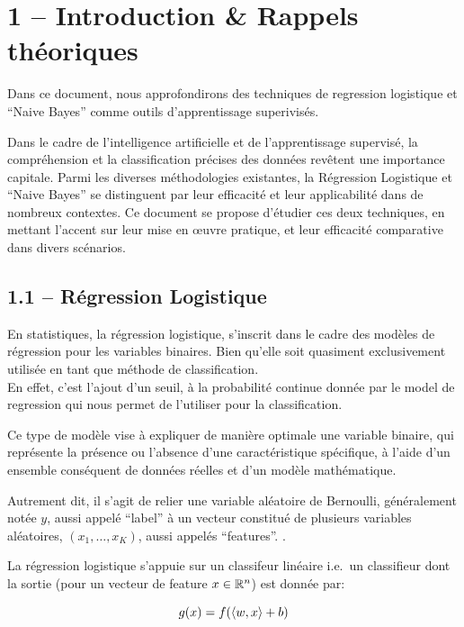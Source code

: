 \documentclass[
]{article}
\author{}
\date{}
\begin{document}
\intro{}

\section{1 -- Introduction \& Rappels
théoriques}\label{introduction-rappels-thuxe9oriques}

Dans ce document, nous approfondirons des techniques de regression
logistique et ``Naive Bayes'' comme outils d'apprentissage superivisés.

Dans le cadre de l'intelligence artificielle et de l'apprentissage
supervisé, la compréhension et la classification précises des données
revêtent une importance capitale. Parmi les diverses méthodologies
existantes, la Régression Logistique et ``Naive Bayes'' se distinguent
par leur efficacité et leur applicabilité dans de nombreux contextes. Ce
document se propose d'étudier ces deux techniques, en mettant l'accent
sur leur mise en œuvre pratique, et leur efficacité comparative dans
divers scénarios.

\subsection{1.1 -- Régression
Logistique}\label{ruxe9gression-logistique}

En statistiques, la régression logistique, s'inscrit dans le cadre des
modèles de régression pour les variables binaires. Bien qu'elle soit
quasiment exclusivement utilisée en tant que méthode de
classification.\\
En effet, c'est l'ajout d'un seuil, à la probabilité continue donnée par
le model de regression qui nous permet de l'utiliser pour la
classification.

Ce type de modèle vise à expliquer de manière optimale une variable
binaire, qui représente la présence ou l'absence d'une caractéristique
spécifique, à l'aide d'un ensemble conséquent de données réelles et d'un
modèle mathématique.

Autrement dit, il s'agit de relier une variable aléatoire de Bernoulli,
généralement notée \(y\), aussi appelé ``label'' à un vecteur constitué
de plusieurs variables aléatoires, \((x_1, \ldots, x_K)\), aussi appelés
``features''. \cite{RegressionLogistique2023}.

La régression logistique s'appuie sur un classifeur linéaire
\cite{ClassifieurLineaire2022} i.e.~un classifieur dont la sortie (pour
un vecteur de feature \(x \in \mathbb{R}^n\)) est donnée par:

\[
g(x) = f(\langle w, x \rangle + b)
\]
\end{document}
